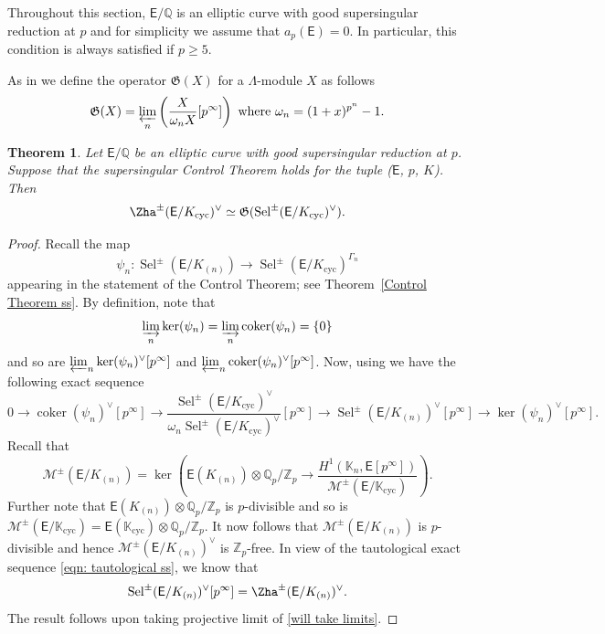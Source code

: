 \documentclass{amsart}
\newtheorem{theorem}{Theorem}[section]
\numberwithin{equation}{section}
\theoremstyle{remark}
\newcommand{\EC}{\mathsf{E}}
\newcommand{\cM}{\mathcal{M}}
\newcommand{\Qp}{\mathbb{Q}_p}
\newcommand{\Kn}{\mathbb{K}_{n}}
\newcommand{\K}{\mathbb{K}}
\newcommand{\Zp}{\mathbb{Z}_p}
\newcommand{\Q}{\mathbb{Q}}
\newcommand{\cyc}{\operatorname{{cyc}}}
\newcommand{\Sel}{\operatorname{Sel}}
\newcommand{\cok}{\operatorname{coker}}
\theoremstyle{plain} %
\begin{document}
Throughout this section, $\EC/\Q$ is an elliptic curve with good supersingular reduction at $p$ and for simplicity we assume that $a_p(\EC) =0$.
In particular, this condition is always satisfied if $p\geq 5$.


As in \cite{Lee20} we define the operator $\mathfrak{G}(X)$ for a $\Lambda$-module $X$ as follows
\[
\mathfrak{G}(X) = \varprojlim_{n} \left( \frac{X}{\omega_n X}[p^\infty]\right) \text{ where } \omega_n = (1+x)^{p^n} -1.
\]

\begin{theorem}
Let $\EC/\Q$ be an elliptic curve with good supersingular reduction at $p$.
Suppose that the supersingular Control Theorem holds for the tuple \textup{(}$\EC$, $p$, $K$\textup{)}.
Then
\[
\Zha^{\pm}
(\EC/K_{\cyc})^\vee \simeq \mathfrak{G}(\Sel^{\pm}(\EC/K_{\cyc})^\vee).
\]
\end{theorem}

\begin{proof}
Recall the map
\[
\psi_n: \Sel^{\pm}(\EC/K_{(n)}) \longrightarrow \Sel^{\pm}(\EC/K_{\cyc})^{\Gamma_n}
\]
appearing in the statement of the Control Theorem; see Theorem~\ref{Control Theorem ss}.
By definition, note that
\[
\varinjlim_n \ker(\psi_n) = \varinjlim_n \cok(\psi_n) = \{0\}
\]
and so are $\varprojlim_n \ker(\psi_n)^\vee[p^\infty]$ and $\varprojlim_n \cok(\psi_n)^\vee[p^\infty]$.
Now, using \cite[Lemma~2.1.4(3)]{Lee20} we have the following exact sequence
\begin{equation}
\label{will take limits}
0 \longrightarrow \cok(\psi_n)^\vee [p^\infty] \longrightarrow \frac{\Sel^{\pm}(\EC/K_{\cyc})^\vee}{\omega_n \Sel^{\pm}(\EC/K_{\cyc})^\vee}[p^\infty] \longrightarrow \Sel^{\pm}(\EC/K_{(n)})^\vee [p^\infty] \longrightarrow \ker(\psi_n)^\vee [p^\infty].
\end{equation}
Recall that
\[
\cM^{\pm}(\EC/K_{(n)})= \ker\left(\EC(K_{(n)}) \otimes \Qp/\Zp \longrightarrow \frac{H^1(\Kn, \EC[p^\infty])}{\cM^{\pm}(\EC/\K_{\cyc})} \right).
\]
Further note that $\EC(K_{(n)}) \otimes \Qp/\Zp$ is $p$-divisible and so is $\cM^{\pm}(\EC/\K_{\cyc}) = \EC(\K_{\cyc}) \otimes \Qp/\Zp$.
It now follows that $\cM^{\pm}(\EC/K_{(n)})$ is $p$-divisible and hence $\cM^{\pm}(\EC/K_{(n)})^\vee$ is $\Zp$-free.
In view of the tautological exact sequence \eqref{eqn: tautological ss}, we know that
\[
\Sel^{\pm}(\EC/K_{(n)})^\vee[p^\infty] = \Zha^{\pm}(\EC/K_{(n)})^\vee.
\]
The result follows upon taking projective limit of \eqref{will take limits}.
\end{proof}
\end{document}
